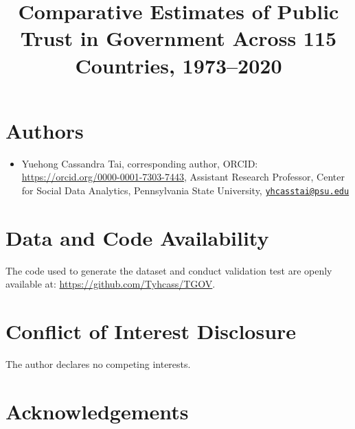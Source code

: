 \documentclass[
  12pt,
]{article}
\title{Comparative Estimates of Public Trust in Government Across 115 Countries, 1973--2020}
\author{}
\date{\vspace{-2.5em}}
\providecommand{\tightlist}{%
  \setlength{\itemsep}{0pt}\setlength{\parskip}{0pt}}
\begin{document}
\maketitle


\section*{Authors}\label{authors}

\begin{itemize}
\tightlist
\item
  Yuehong Cassandra Tai, corresponding author, ORCID: \url{https://orcid.org/0000-0001-7303-7443}, Assistant Research Professor, Center for Social Data Analytics, Pennsylvania State University, \href{mailto:yhcasstai@psu.edu}{\nolinkurl{yhcasstai@psu.edu}}
\end{itemize}

\section{Data and Code Availability}\label{data-and-code-availability}

The code used to generate the dataset and conduct validation test are openly available at: \url{https://github.com/Tyhcass/TGOV}.

\section{Conflict of Interest Disclosure}\label{conflict-of-interest-disclosure}

The author declares no competing interests.

\section{Acknowledgements}\label{acknowledgements}

\pagebreak

\renewcommand{\baselinestretch}{1}
\selectfont
\maketitle
\renewcommand{\baselinestretch}{1.5}
\selectfont
\end{document}
